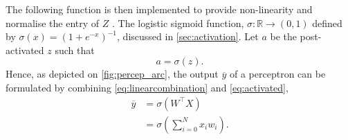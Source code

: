 The following function is then implemented to provide non-linearity and normalise the entry of $Z$ \parencite{LIU2020283}. The logistic sigmoid function, $\sigma:\mathbb{R}\rightarrow (0,1)$ defined by $\sigma(x)=(1+e^{-x})^{-1}$, discussed in \autoref{sec:activation}. Let $a$ be the post-activated $z$ such that
\begin{equation}
    a=\sigma(z).
    \label{eq:activated}
\end{equation}
Hence, as depicted on \autoref{fig:percep_arc}, the output $\overline{y}$ of a perceptron can be formulated by combining \autoref{eq:linearcombination} and \autoref{eq:activated},
\begin{align}
   \overline{y} &= \sigma(W^\top X) \\
    &= \sigma\left(\sum_{i=0}^N{x_iw_i}\right). \nonumber
\end{align}
\vspace{-.5cm}